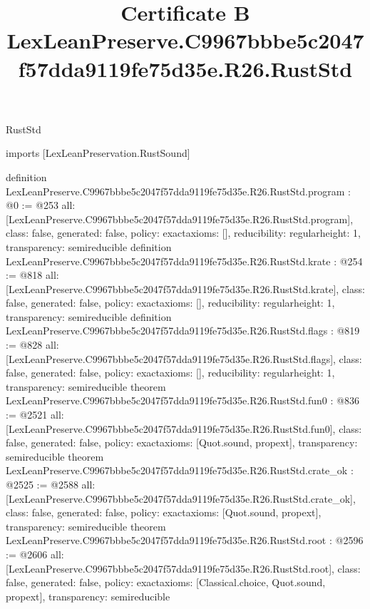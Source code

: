 \begin{lexlean}{RustStd}
\title{Certificate B LexLeanPreserve.C9967bbbe5c2047f57dda9119fe75d35e.R26.RustStd}
\begin{coremodule}
imports [LexLeanPreservation.RustSound]

definition LexLeanPreserve.C9967bbbe5c2047f57dda9119fe75d35e.R26.RustStd.program : @0 := @253 {
  all: [LexLeanPreserve.C9967bbbe5c2047f57dda9119fe75d35e.R26.RustStd.program],
  class: false,
  generated: false,
  policy: exact{axioms: []},
  reducibility: regular{height: 1},
  transparency: semireducible
}
definition LexLeanPreserve.C9967bbbe5c2047f57dda9119fe75d35e.R26.RustStd.krate : @254 := @818 {
  all: [LexLeanPreserve.C9967bbbe5c2047f57dda9119fe75d35e.R26.RustStd.krate],
  class: false,
  generated: false,
  policy: exact{axioms: []},
  reducibility: regular{height: 1},
  transparency: semireducible
}
definition LexLeanPreserve.C9967bbbe5c2047f57dda9119fe75d35e.R26.RustStd.flags : @819 := @828 {
  all: [LexLeanPreserve.C9967bbbe5c2047f57dda9119fe75d35e.R26.RustStd.flags],
  class: false,
  generated: false,
  policy: exact{axioms: []},
  reducibility: regular{height: 1},
  transparency: semireducible
}
theorem LexLeanPreserve.C9967bbbe5c2047f57dda9119fe75d35e.R26.RustStd.fun0 : @836 := @2521 {
  all: [LexLeanPreserve.C9967bbbe5c2047f57dda9119fe75d35e.R26.RustStd.fun0],
  class: false,
  generated: false,
  policy: exact{axioms: [Quot.sound, propext]},
  transparency: semireducible
}
theorem LexLeanPreserve.C9967bbbe5c2047f57dda9119fe75d35e.R26.RustStd.crate_ok : @2525 := @2588 {
  all: [LexLeanPreserve.C9967bbbe5c2047f57dda9119fe75d35e.R26.RustStd.crate_ok],
  class: false,
  generated: false,
  policy: exact{axioms: [Quot.sound, propext]},
  transparency: semireducible
}
theorem LexLeanPreserve.C9967bbbe5c2047f57dda9119fe75d35e.R26.RustStd.root : @2596 := @2606 {
  all: [LexLeanPreserve.C9967bbbe5c2047f57dda9119fe75d35e.R26.RustStd.root],
  class: false,
  generated: false,
  policy: exact{axioms: [Classical.choice, Quot.sound, propext]},
  transparency: semireducible
}


\end{coremodule}
\end{lexlean}
